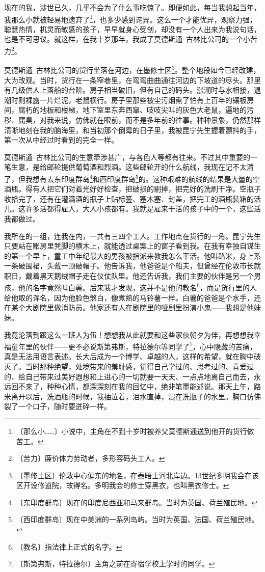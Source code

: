 \documentclass[12pt,UTF-8,openany]{ctexbook}
\begin{document}
\begin{large}
    
    现在的我，涉世已久，几乎不会为了什么事吃惊了。即便如此，每当我想起当年，我那么小就被轻易地遗弃了\footnote{〔那么小……〕小说中，主角在不到十岁时被养父莫德斯通送到他开的货行做苦工。}，也多少感到诧异。这么一个才能优异，观察力强，聪慧热情，机灵而敏感的孩子，早早就身心受创，却没有一个人出来为我说句话，也是不可思议。就这样，在我十岁那年，我成了莫德斯通–古林比公司的一个小苦力\footnote{〔苦力〕廉价体力劳动者，多形容码头工人。}。
    
    莫德斯通–古林比公司的货行坐落在河边，在墨修士区\footnote{〔墨修士区〕伦敦中心偏东的地名，在泰晤士河北岸边。13世纪多明我会在该区开设修道院，故得名。多明我会的修士穿黑衣，也叫黑衣修士。}。整个地段如今已经改建，大为改观。当时，货行在一条窄巷里，在弯弯曲曲通往河边的下坡道的尽头。那里有几级供人上落船的台阶。房子相当破旧，但有自己的码头。涨潮时与水相接，退潮时则裸露一片烂泥，老鼠横行。房子里那些被尘污烟熏了怕有上百年的镶板房间，腐朽的地板和楼梯，地下室里东奔西窜、吱吱尖叫的灰色大老鼠，遍地的污秽、腐臭，对我来说，仿佛就在眼前，而不是多年前的往事。种种景象，仍然那样清晰地刻在我的脑海里，和当初那个倒霉的日子里，我被昆宁先生握着颤抖的手，第一次从中经过时看到的完全一样。
    
    莫德斯通–古林比公司的生意牵涉甚广，与各色人等都有往来。不过其中重要的一笔生意，是给邮轮提供葡萄酒和烈酒。这些邮轮开的什么航线，我现在记不太清了，但我想有去东印度群岛\footnote{〔东印度群岛〕现在的印度尼西亚和马来群岛。当时为英国、荷兰殖民地。}和西印度群岛\footnote{〔西印度群岛〕现在中美洲的一系列岛屿。当时为英国、法国、荷兰殖民地。}的。这种艰难的航线的结果是大量的空酒瓶。得有人把它们对着光好好检查，把破损的剔掉，把完好的洗刷干净。空瓶子收拾完了，还有在灌满酒的瓶子上贴标签、塞木塞、封盖，把完工的酒瓶装箱的活儿。这许多活都得雇人，大人小孩都有。我就是雇来干活的孩子中的一个，这些活我都做过。
    
    我所在的一组，连我在内，一共有三四个工人。工作地点在货行的一角。昆宁先生只要站在账房里凳脚的横木上，就能透过桌案上的窗子看到我。在我有幸独自谋生的第一个早上，童工中年纪最大的男孩被指派来教我怎么干活。他叫路米，身上系一条破围裙，头戴一顶破帽子。他告诉我，他爸爸是个船夫，但曾经在伦敦市长就职日，戴着黑天鹅绒帽子走在仪仗队里。他还告诉我，我们主要的伙伴是另一个男孩，他的名字竟然叫白薯。后来我才发现，这并不是他的教名\footnote{〔教名〕指法律上正式的名字。}，而是货行里的人给他取的诨名，因为他脸色煞白，像煮熟的马铃薯一样。白薯的爸爸是个水手，还在某个大剧院里做消防员。他家还有人在剧院里的哑剧里扮演小鬼——我想是他妹妹。
    
    我竟沦落到跟这么一班人为伍！想想我从此就要和这些家伙朝夕为伴，再想想我幸福童年里的伙伴——更不必说斯第弗斯，特拉德尔等同学了\footnote{〔斯第弗斯，特拉德尔〕主角之前在寄宿学校上学时的同学。}，心中隐藏的苦痛，真是无法用语言表述。长大后成为一个博学、卓越的人，这样的希望，就在胸中破灭了。当时那种绝望，处境带来的羞耻感，觉得自己学过的、思考过的、喜爱过的、给自己带来过美好遐想和上进心的一切就要一天天、一点点地离自己而去，永远回不来了，种种心情，都深深刻在我的回忆中，绝非笔墨能述说。那天上午，路米离开以后，洗酒瓶的时候，我抽泣着，泪水直掉，混在洗瓶子的水里。胸口仿佛裂了一个口子，随时要迸碎一样。
    

\end{large}
\end{document}
